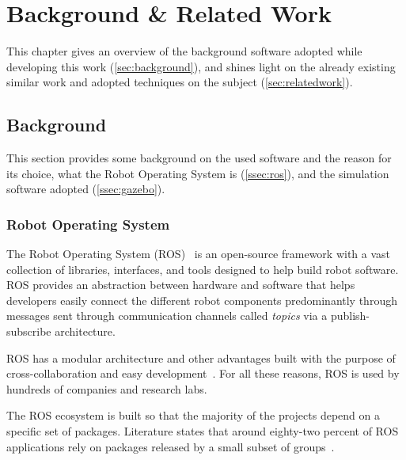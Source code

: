 \chapter{Background \& Related Work}
\label{chap:background}

This chapter gives an overview of the background software adopted while developing this work (\autoref{sec:background}), and shines light on the already existing similar work and adopted techniques on the subject (\autoref{sec:relatedwork}).


\section{Background}
\label{sec:background}

This section provides some background on the used software and the reason for its choice, what the Robot Operating System is (\autoref{ssec:ros}), and the simulation software adopted (\autoref{ssec:gazebo}).


\subsection{Robot Operating System}
\label{ssec:ros}

The Robot Operating System (ROS)~\cite{quigley2009ros} is an open-source framework with a vast collection of libraries, interfaces, and tools designed to help build robot software. ROS provides an abstraction between hardware and software that helps developers easily connect the different robot components predominantly through messages sent through communication channels called \textit{topics} via a publish-subscribe architecture.

ROS has a modular architecture and other advantages built with the purpose of cross-collaboration and easy development~\cite{ros-industrial}. For all these reasons, ROS is used by hundreds of companies and research labs.

The ROS ecosystem is built so that the majority of the projects depend on a specific set of packages.
Literature states that around eighty-two percent of ROS applications rely on packages released by a small subset of groups~\cite{9240632}.


